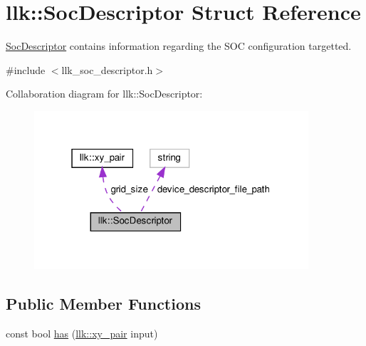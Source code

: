 \hypertarget{structllk_1_1SocDescriptor}{}\section{llk\+:\+:Soc\+Descriptor Struct Reference}
\label{structllk_1_1SocDescriptor}


\hyperlink{structllk_1_1SocDescriptor}{Soc\+Descriptor} contains information regarding the S\+OC configuration targetted.  




{\ttfamily \#include $<$llk\+\_\+soc\+\_\+descriptor.\+h$>$}



Collaboration diagram for llk\+:\+:Soc\+Descriptor\+:\nopagebreak
\begin{figure}[H]
\begin{center}
\leavevmode
\includegraphics[width=289pt]{structllk_1_1SocDescriptor__coll__graph}
\end{center}
\end{figure}
\subsection*{Public Member Functions}
\begin{DoxyCompactItemize}
\item 
const bool \hyperlink{structllk_1_1SocDescriptor_a5c4fdff7e4fe3c2de5bb775f28da7940}{has} (\hyperlink{structllk_1_1xy__pair}{llk\+::xy\+\_\+pair} input)
\end{DoxyCompactItemize}
